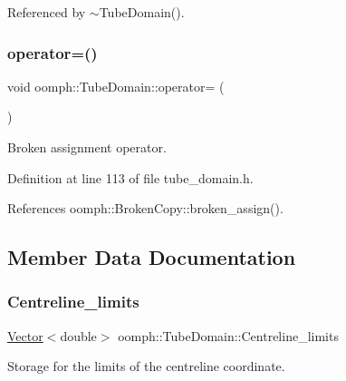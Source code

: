 Referenced by $\sim$\+Tube\+Domain().

\mbox{\label{classoomph_1_1TubeDomain_a3731e671028bb0ea3b01e7fe2723cbbc}} 
\subsubsection{\texorpdfstring{operator=()}{operator=()}}
{\footnotesize\ttfamily void oomph\+::\+Tube\+Domain\+::operator= (\begin{DoxyParamCaption}\item[{const \hyperlink{classoomph_1_1TubeDomain}{Tube\+Domain} \&}]{ }\end{DoxyParamCaption})\hspace{0.3cm}{\ttfamily [inline]}}



Broken assignment operator. 



Definition at line 113 of file tube\+\_\+domain.\+h.



References oomph\+::\+Broken\+Copy\+::broken\+\_\+assign().



\subsection{Member Data Documentation}
\mbox{\label{classoomph_1_1TubeDomain_a472cea9a87841cc70a3b8a65e87f6aff}} 
\subsubsection{\texorpdfstring{Centreline\+\_\+limits}{Centreline\_limits}}
{\footnotesize\ttfamily \hyperlink{classoomph_1_1Vector}{Vector}$<$double$>$ oomph\+::\+Tube\+Domain\+::\+Centreline\+\_\+limits\hspace{0.3cm}{\ttfamily [private]}}



Storage for the limits of the centreline coordinate. 



